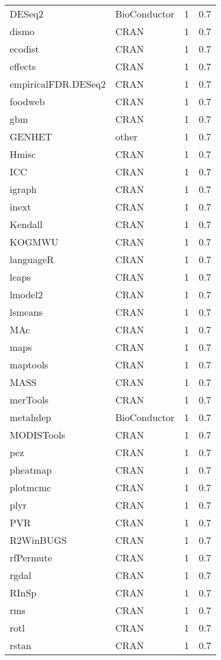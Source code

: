 \begin{table}[ht]
\begin{tabular}{llrr}
  DESeq2 & BioConductor & 1 & 0.7 \\ 
  dismo & CRAN & 1 & 0.7 \\ 
  ecodist & CRAN & 1 & 0.7 \\ 
  effects & CRAN & 1 & 0.7 \\ 
  empiricalFDR.DESeq2 & CRAN & 1 & 0.7 \\ 
  foodweb & CRAN & 1 & 0.7 \\ 
  gbm & CRAN & 1 & 0.7 \\ 
  GENHET & other & 1 & 0.7 \\ 
  Hmisc & CRAN & 1 & 0.7 \\ 
  ICC & CRAN & 1 & 0.7 \\ 
  igraph & CRAN & 1 & 0.7 \\ 
  inext & CRAN & 1 & 0.7 \\ 
  Kendall & CRAN & 1 & 0.7 \\ 
  KOGMWU & CRAN & 1 & 0.7 \\ 
  languageR & CRAN & 1 & 0.7 \\ 
  leaps & CRAN & 1 & 0.7 \\ 
  lmodel2 & CRAN & 1 & 0.7 \\ 
  lsmeans & CRAN & 1 & 0.7 \\ 
  MAc & CRAN & 1 & 0.7 \\ 
  maps & CRAN & 1 & 0.7 \\ 
  maptools & CRAN & 1 & 0.7 \\ 
  MASS & CRAN & 1 & 0.7 \\ 
  merTools & CRAN & 1 & 0.7 \\ 
  metahdep & BioConductor & 1 & 0.7 \\ 
  MODISTools & CRAN & 1 & 0.7 \\ 
  pez & CRAN & 1 & 0.7 \\ 
  pheatmap & CRAN & 1 & 0.7 \\ 
  plotmcmc & CRAN & 1 & 0.7 \\ 
  plyr & CRAN & 1 & 0.7 \\ 
  PVR & CRAN & 1 & 0.7 \\ 
  R2WinBUGS & CRAN & 1 & 0.7 \\ 
  rfPermute & CRAN & 1 & 0.7 \\ 
  rgdal & CRAN & 1 & 0.7 \\ 
  RInSp & CRAN & 1 & 0.7 \\ 
  rms & CRAN & 1 & 0.7 \\ 
  rotl & CRAN & 1 & 0.7 \\ 
  rstan & CRAN & 1 & 0.7 \\ 

\end{tabular}
\end{table}

